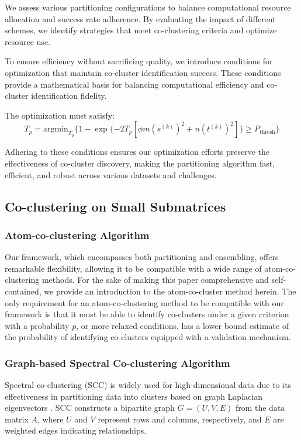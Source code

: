 \documentclass[letterpaper, 10 pt, conference]{ieeeconf}  %
\begin{document}
We assess various partitioning configurations to balance computational resource allocation and success rate adherence. By evaluating the impact of different schemes, we identify strategies that meet co-clustering criteria and optimize resource use.

To ensure efficiency without sacrificing quality, we introduce conditions for optimization that maintain co-cluster identification success. These conditions provide a mathematical basis for balancing computational efficiency and co-cluster identification fidelity.

The optimization must satisfy:
\begin{equation}
    \label{eq:optimization_condition}
    T_p = \text{argmin}_{T_p} \{
    1 - \exp \{ -2 T_p [\phi m (s^{(k)})^2 + n (t^{(k)})^2] \} \ge P_{\text{thresh}} \}
\end{equation}

Adhering to these conditions ensures our optimization efforts preserve the effectiveness of co-cluster discovery, making the partitioning algorithm fast, efficient, and robust across various datasets and challenges.

\subsection{Co-clustering on Small Submatrices}

\subsubsection{Atom-co-clustering Algorithm}
Our framework, which encompasses both partitioning and ensembling, offers remarkable flexibility, allowing it to be compatible with a wide range of atom-co-clustering methods. For the sake of making this paper comprehensive and self-contained, we provide an introduction to the atom-co-cluster method herein. The only requirement for an atom-co-clustering method to be compatible with our framework is that it must be able to identify co-clusters under a given criterion with a probability $p$, or more relaxed conditions, has a lower bound estimate of the probability of identifying co-clusters equipped with a validation mechanism.

\subsubsection{Graph-based Spectral Co-clustering Algorithm}
Spectral co-clustering (SCC) is widely used for high-dimensional data due to its effectiveness in partitioning data into clusters based on graph Laplacian eigenvectors \cite{vonluxburg2007TutorialSpectralClustering}. SCC constructs a bipartite graph $G=(U,V,E)$ from the data matrix $A$, where $U$ and $V$ represent rows and columns, respectively, and $E$ are weighted edges indicating relationships.
\end{document}
